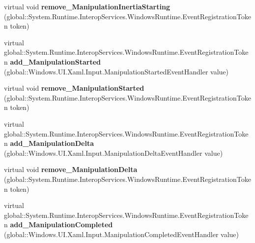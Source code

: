 \begin{DoxyCompactItemize}
\item 
\mbox{\label{class_windows_1_1_u_i_1_1_xaml_1_1_u_i_element_a70d5f221b113c0f94830ff04ba95e077}} 
virtual void {\bfseries remove\+\_\+\+Manipulation\+Inertia\+Starting} (global\+::\+System.\+Runtime.\+Interop\+Services.\+Windows\+Runtime.\+Event\+Registration\+Token token)
\item 
\mbox{\label{class_windows_1_1_u_i_1_1_xaml_1_1_u_i_element_a267e7d9d4c83d6c6a025e11165660ad9}} 
virtual global\+::\+System.\+Runtime.\+Interop\+Services.\+Windows\+Runtime.\+Event\+Registration\+Token {\bfseries add\+\_\+\+Manipulation\+Started} (global\+::\+Windows.\+U\+I.\+Xaml.\+Input.\+Manipulation\+Started\+Event\+Handler value)
\item 
\mbox{\label{class_windows_1_1_u_i_1_1_xaml_1_1_u_i_element_af6ad67fc431c2034b4431d6cf4776b22}} 
virtual void {\bfseries remove\+\_\+\+Manipulation\+Started} (global\+::\+System.\+Runtime.\+Interop\+Services.\+Windows\+Runtime.\+Event\+Registration\+Token token)
\item 
\mbox{\label{class_windows_1_1_u_i_1_1_xaml_1_1_u_i_element_ac039d3e48cf74001e79d9a00893c2fb0}} 
virtual global\+::\+System.\+Runtime.\+Interop\+Services.\+Windows\+Runtime.\+Event\+Registration\+Token {\bfseries add\+\_\+\+Manipulation\+Delta} (global\+::\+Windows.\+U\+I.\+Xaml.\+Input.\+Manipulation\+Delta\+Event\+Handler value)
\item 
\mbox{\label{class_windows_1_1_u_i_1_1_xaml_1_1_u_i_element_aba1edd03abe3a079446b00630ed5e5ce}} 
virtual void {\bfseries remove\+\_\+\+Manipulation\+Delta} (global\+::\+System.\+Runtime.\+Interop\+Services.\+Windows\+Runtime.\+Event\+Registration\+Token token)
\item 
\mbox{\label{class_windows_1_1_u_i_1_1_xaml_1_1_u_i_element_a977eb5bb8e170069cf88e863a41c5bb5}} 
virtual global\+::\+System.\+Runtime.\+Interop\+Services.\+Windows\+Runtime.\+Event\+Registration\+Token {\bfseries add\+\_\+\+Manipulation\+Completed} (global\+::\+Windows.\+U\+I.\+Xaml.\+Input.\+Manipulation\+Completed\+Event\+Handler value)

\end{DoxyCompactItemize}
